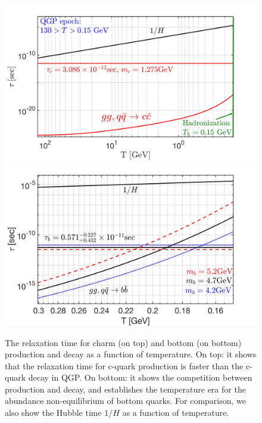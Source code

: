 \documentclass[universe,article,submit,moreauthors,pdftex,a4paper]{Definitions/mdpi}
\begin{document}
\begin{figure} %
\begin{center}
\includegraphics[width=\linewidth]{CharmQuark_QGP.jpg}\\
\includegraphics[width=\linewidth]{BQuarkReactionTime_bottom.jpg}
\caption{ The relaxation time for charm (on top) and bottom (on bottom) production and decay as a function of temperature. On top: it shows that the relaxation time for c-quark production is faster than the c-quark decay in QGP. On bottom: it shows the competition between production and decay, and  establishes the temperature era for the abundance non-equilibrium of bottom quarks. For comparison, we also show the Hubble time $1/H$ as a function of temperature.}
\label{BCreaction_fig}
\end{center}
\end{figure}
\end{document}
